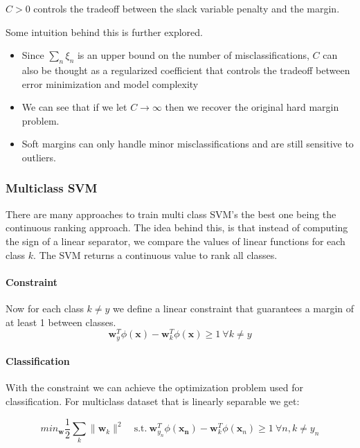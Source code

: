 \documentclass[12pt]{article}
\begin{document}
            $C > 0$ controls the tradeoff between the slack variable penalty and the margin. 
            
            
            Some intuition behind this is further explored. 
            \begin{itemize}
                \item Since $\sum_n \xi_n$ is an upper bound on the number of 
                misclassifications, $C$ can also be thought as a regularized coefficient that controls the tradeoff between 
                error minimization and model complexity
                \item We can see that if we let $C \rightarrow \infty$ then we recover the
                original hard margin problem.
                \item Soft margins can only handle minor misclassifications and are still sensitive 
                to outliers.
            \end{itemize}        
        
        
        \subsubsection{Multiclass SVM}
            There are many approaches to train multi class SVM's the best one being the continuous ranking approach. The
            idea behind this, is that instead of computing the sign of a linear separator, we compare the values of linear
            functions for each class $k$. The SVM returns a continuous value to rank all classes.

            \paragraph{Constraint}
            Now for each class $k \neq y$ we define a linear constraint that guarantees a margin of at least 1 between classes.
            $$ \boldsymbol{w}^T_y \phi(\boldsymbol{x}) - \boldsymbol{w}^T_k\phi(\boldsymbol{x}) \geq 1 \ \forall k \neq
            y $$

            \paragraph{Classification}
            With the constraint we can achieve the optimization problem used for classification. For multiclass dataset
            that is linearly separable we get:

            $$ min_{\boldsymbol{w}} \frac{1}{2} \sum_k \|\boldsymbol{w}_k \|^2 \quad \textrm{s.t.} \
            \boldsymbol{w}^T_{y_n} \phi(\boldsymbol{x_n}) - \boldsymbol{w}^T_k \phi(\boldsymbol{x}_n) \geq 1 \ 
            \forall n,k \neq y_n $$
\end{document}
